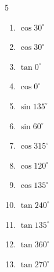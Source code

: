 \begin{multicols}{5}
\begin{enumerate}
  \item $\displaystyle \cos{30^\circ}$


  \item $\displaystyle \cos{30^\circ}$


  \item $\displaystyle \tan{0^\circ}$

        \phantom{$\displaystyle =0$}

  \item $\displaystyle \cos{0^\circ}$

        \phantom{$\displaystyle =1$}

  \item $\displaystyle \sin{135^\circ}$


  \item $\displaystyle \sin{60^\circ}$


  \item $\displaystyle \cos{315^\circ}$


\columnbreak %

  \item $\displaystyle \cos{120^\circ}$


  \item $\displaystyle \cos{135^\circ}$


  \item $\displaystyle \tan{240^\circ}$


  \item $\displaystyle \tan{135^\circ}$

        \phantom{$\displaystyle =-1$}

  \item $\displaystyle \tan{360^\circ}$

        \phantom{$\displaystyle =0$}

  \item $\displaystyle \tan{270^\circ}$


\end{enumerate}
\end{multicols}
